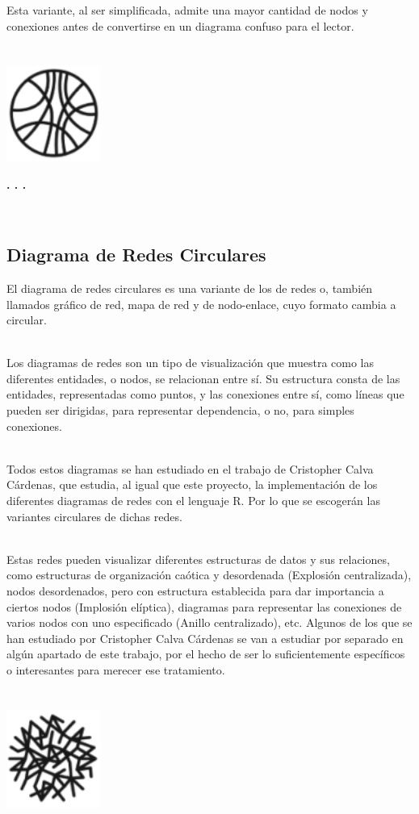 \documentclass{article}\usepackage[]{graphicx}\usepackage[]{color}
\begin{document}
Esta variante, al ser simplificada, admite una mayor cantidad de nodos y conexiones antes de convertirse en un diagrama confuso para el lector.
~\\~\\~\\
\vbox{
    \centering
    \includegraphics[width=0.23\textwidth]{imag/cuer}
}
\begin{center}
\textbf{. . .}
\end{center}
~\\
\subsection{Diagrama de Redes Circulares}
El diagrama de redes circulares es una variante de los de redes o, tambi\'en llamados gr\'afico de red, mapa de red y de nodo-enlace, cuyo formato cambia a circular.~\\~\par
Los diagramas de redes son un tipo de visualizaci\'on que muestra como las diferentes entidades, o nodos, se relacionan entre s\'i. Su estructura consta de las entidades, representadas como puntos, y las conexiones entre s\'i, como l\'ineas que pueden ser dirigidas, para representar dependencia, o no, para simples conexiones.~\\~\par
Todos estos diagramas se han estudiado en el trabajo de Cristopher Calva C\'ardenas\cite{tfg}, que estudia, al igual que este proyecto, la implementaci\'on de los diferentes diagramas de redes con el lenguaje R. Por lo que se escoger\'an las variantes circulares de dichas redes.~\\~\par
Estas redes pueden visualizar diferentes estructuras de datos y sus relaciones, como estructuras de organizaci\'on ca\'otica y desordenada (Explosi\'on centralizada),  nodos desordenados, pero con estructura establecida para dar importancia a ciertos nodos (Implosi\'on el\'iptica), diagramas para representar las conexiones de varios nodos con uno especificado (Anillo centralizado), etc.  Algunos de los que se han estudiado por Cristopher Calva C\'ardenas se van a estudiar por separado en alg\'un apartado de este trabajo, por el hecho de ser lo suficientemente espec\'ificos o interesantes para merecer ese tratamiento. 
~\\~\\~\\
\vbox{
    \centering
    \includegraphics[width=0.23\textwidth]{imag/redes}
}
\clearpage
\end{document}
